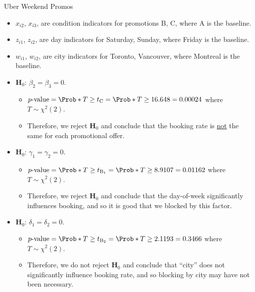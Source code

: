 \begin{Example}{Uber Weekend Promos}{}
    \begin{itemize}
        \item $ x_{i2} $, $ x_{i3} $, are condition indicators for promotions B, C, where A is the baseline.
        \item $ z_{i1} $, $ z_{i2} $, are day indicators for Saturday, Sunday, where Friday is the baseline.
        \item $ w_{i1} $, $ w_{i2} $, are city indicators for Toronto, Vancouver, where Montreal is the baseline.
    \end{itemize}
    \begin{itemize}
        \item $ \mathbf{H}_0 $: $ \beta_2=\beta_3=0 $.
              \begin{itemize}
                  \item $ p\text{-value}=\Prob*{T\ge t_\text{C}}=\Prob*{T\ge 16.648}=0.00024 $ where $ T \sim \chi^2(2) $.
                  \item Therefore, we reject $ \mathbf{H}_0 $ and conclude that the booking rate is \underline{not} the same
                        for each promotional offer.
              \end{itemize}
        \item $ \mathbf{H}_0 $: $ \gamma_1=\gamma_2=0 $.
              \begin{itemize}
                  \item $ p\text{-value}=\Prob*{T\ge t_{\text{B}_1}}=\Prob*{T\ge 8.9107}=0.01162 $ where $ T \sim \chi^2(2) $.
                  \item Therefore, we reject $ \mathbf{H}_0 $ and conclude that the day-of-week significantly influences booking, and so it is good that we blocked by this factor.
              \end{itemize}
        \item $ \mathbf{H}_0 $: $ \delta_1=\delta_2=0 $.
              \begin{itemize}
                  \item $ p\text{-value}=\Prob*{T\ge t_{\text{B}_2}}=\Prob*{T\ge 2.1193}=0.3466 $ where $ T \sim \chi^2(2) $.
                  \item Therefore, we do not reject $ \mathbf{H}_0 $ and conclude that ``city'' does not significantly influence booking rate, and so blocking by city may have not been necessary.
              \end{itemize}
    \end{itemize}

\end{Example}
